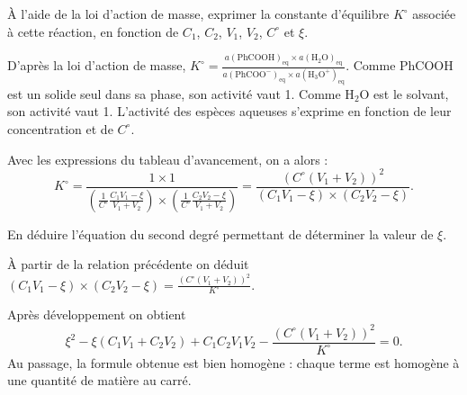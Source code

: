 \begin{enonce}
À l'aide de la loi d'action de masse, exprimer la constante d'équilibre $K^\circ$ associée à cette réaction, en fonction de $C_1$, $C_2$, $V_1$, $V_2$, $C^\circ$ et $\xi$. \minusBigskip

\end{enonce}


\begin{corrige}
D'après la loi d'action de masse, $K^\circ=\frac{a(\text{PhCOOH})_\text{eq}\times a(\text{H}_2\text{O})_\text{eq}}{a(\text{PhCOO}^-)_\text{eq}\times a(\text{H}_3\text{O}^+)_\text{eq}}$. Comme PhCOOH est un solide seul dans sa phase, son activité vaut 1. Comme H$_2$O est le solvant, son activité vaut 1. L'activité des espèces aqueuses s'exprime en fonction de leur concentration et de $C^\circ$. 

Avec les expressions du tableau d'avancement, on a alors : 
\[
K^\circ=\frac{1\times 1}{\left(\frac{1}{C^\circ}\frac{C_1V_1-\xi}{V_1+V_2}\right)\times\left(\frac{1}{C^\circ}\frac{C_2V_2-\xi}{V_1+V_2}\right)}=
\frac{\left(C^\circ(V_1+V_2)\right)^2}{\left(C_1V_1-\xi\right)\times\left(C_2V_2-\xi\right)}.
\]
\end{corrige}



\begin{enonce}
En déduire l'équation du second degré permettant de déterminer la valeur de $\xi$.

\end{enonce}


\begin{corrige}
À partir de la relation précédente on déduit $\left(C_1V_1-\xi\right)\times\left(C_2V_2-\xi\right)=\frac{\left(C^\circ(V_1+V_2)\right)^2}{K^\circ}$.

Après développement on obtient \minusBigskip
\[
\xi^2-\xi(C_1V_1+C_2V_2)+C_1C_2V_1V_2-\frac{\left(C^\circ(V_1+V_2)\right)^2}{K^\circ}=0.
\]
Au passage, la formule obtenue est bien homogène : chaque terme est homogène à une quantité de matière au carré.
\end{corrige}

